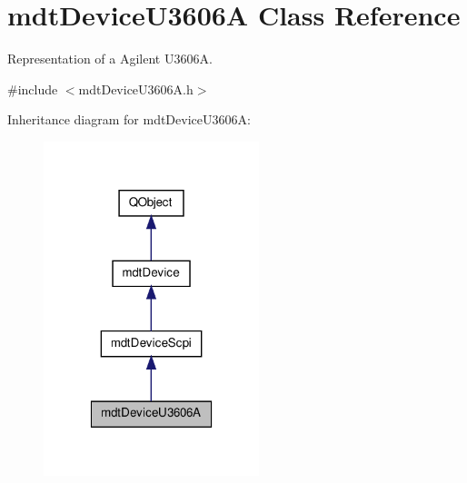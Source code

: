 \hypertarget{classmdt_device_u3606_a}{\section{mdt\-Device\-U3606\-A Class Reference}
\label{classmdt_device_u3606_a}
}


Representation of a Agilent U3606\-A.  




{\ttfamily \#include $<$mdt\-Device\-U3606\-A.\-h$>$}



Inheritance diagram for mdt\-Device\-U3606\-A\-:
\nopagebreak
\begin{figure}[H]
\begin{center}
\leavevmode
\includegraphics[width=178pt]{classmdt_device_u3606_a__inherit__graph}
\end{center}
\end{figure}


